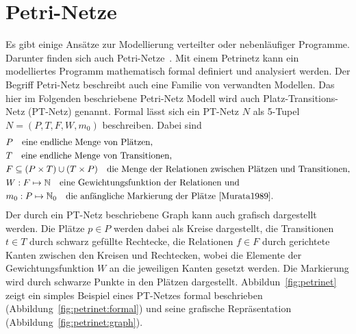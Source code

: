 \section{Petri-Netze}
Es gibt einige Ansätze zur Modellierung verteilter oder nebenläufiger Programme. Darunter finden sich auch Petri-Netze~\cite{Murata1989}. Mit einem Petrinetz kann ein modelliertes Programm mathematisch formal definiert und analysiert werden. Der Begriff Petri-Netz beschreibt auch eine Familie von verwandten Modellen. Das hier im Folgenden beschriebene Petri-Netz Modell wird auch Platz-Transitions-Netz (PT-Netz) genannt. Formal lässt sich ein PT-Netz $N$ als 5-Tupel $ N=(P,T,F,W,m_0)$ beschreiben. Dabei sind 
\begin{align*}
	&P  \quad \text{eine endliche Menge von Plätzen,}\\
	&T  \quad \text{eine endliche Menge von Transitionen,}\\
	&F \subseteq (P\times T) \cup (T \times P) \quad \text{die Menge der Relationen zwischen Plätzen und Transitionen,}\\
	&W: F \mapsto \mathbb{N}  \quad \text{eine Gewichtungsfunktion der Relationen und}\\
	&m_0: P \mapsto \mathbb{N}_0   \quad \text{die anfängliche Markierung der Plätze~\cite{Murata1989}.}\\
\end{align*}
Der durch ein PT-Netz beschriebene Graph kann auch grafisch dargestellt werden. Die Plätze $p \in P$ werden dabei als Kreise dargestellt, die Transitionen $ t \in T$ durch schwarz gefüllte Rechtecke, die Relationen $ f \in F$ durch gerichtete Kanten zwischen den Kreisen und Rechtecken, wobei die Elemente der Gewichtungsfunktion $W$ an die jeweiligen Kanten gesetzt werden. Die Markierung wird durch schwarze Punkte in den Plätzen dargestellt. Abbildun~\ref{fig:petrinet} zeigt ein simples Beispiel eines PT-Netzes  formal beschrieben (Abbildung~\ref{fig:petrinet:formal}) und seine grafische Repräsentation (Abbildung~\ref{fig:petrinet:graph}).
